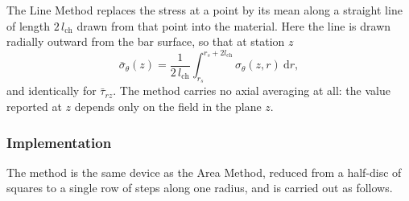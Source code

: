 The Line Method replaces the stress at a point by its mean along a straight
line of length $2\,l_{\mathrm{ch}}$ drawn from that point into the material.
Here the line is drawn radially outward from the bar surface, so that at
station $z$
\begin{equation}
\label{eq:lmcont}
\bar{\sigma}_\theta(z) = \frac{1}{2\,l_{\mathrm{ch}}}
  \int_{r_s}^{r_s + 2 l_{\mathrm{ch}}} \sigma_\theta(z, r)\ \mathrm{d}r,
\end{equation}
and identically for $\bar{\tau}_{rz}$. The method carries no axial averaging
at all: the value reported at $z$ depends only on the field in the plane $z$.
 
\subsubsection*{Implementation}
 
The method is the same device as the Area Method, reduced from a half-disc of
squares to a single row of steps along one radius, and is carried out as
follows.
 
